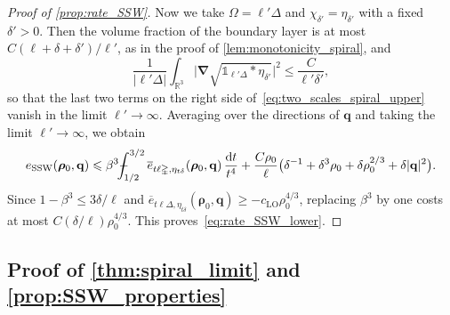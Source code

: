 \documentclass[final,reqno]{amsart}
\theoremstyle{remark}
\renewcommand{\le}{\leqslant}
\renewcommand{\ge}{\geqslant}
\newcommand{\ol}[1]{\overline{#1}}
\newcommand{\RR}{\mathbb{R}}
\newcommand{\LO}{\mathrm{LO}}
\newcommand{\SSW}{\mathrm{SSW}}
\newcommand{\iden}{\mathbb{1}}
\newcommand{\grad}{\bm{\nabla}}
\newcommand{\tetra}{\mathbb{\Delta}}
\newcommand{\dd}{\mathrm{d}}
\def\Xint#1{\mathchoice
{\XXint\displaystyle\textstyle{#1}}
{\XXint\textstyle\scriptstyle{#1}}
{\XXint\scriptstyle\scriptscriptstyle{#1}}
{\XXint\scriptscriptstyle\scriptscriptstyle{#1}}
\!\int}
\def\XXint#1#2#3{{\setbox0=\hbox{$#1{#2#3}{\int}$ }
\vcenter{\hbox{$#2#3$ }}\kern-.6\wd0}}
\def\dashint{\Xint-}
\begin{document}
\begin{proof}[Proof of \cref{prop:rate_SSW}]
Now we take $\Omega=\ell'\tetra$ and $\chi_{\delta'}=\eta_{\delta'}$ with a fixed $\delta'>0$. Then the volume fraction of the boundary layer is at most $C(\ell+\delta+\delta')/\ell'$, as in the proof of \cref{lem:monotonicity_spiral}, and
\[
 \frac{1}{|\ell'\tetra|}\int_{\RR^3}\big|\grad\sqrt{\iden_{\ell'\tetra}\ast\eta_{\delta'}}\big|^2\le\frac{C}{\ell'\delta'},
\]
so that the last two terms on the right side of~\cref{eq:two_scales_spiral_upper} vanish in the limit $\ell'\to\infty$. Averaging over the directions of $\mathbf{q}$ and taking the limit $\ell'\to\infty$, we obtain
\[
 e_\SSW(\bm{\rho}_0,\mathbf{q})\le\beta^3\dashint_{1/2}^{3/2}\ol e_{t\ell\tetra,\eta_{t\delta}}(\bm{\rho}_0,\mathbf{q})\,\frac{\dd t}{t^4}
 +\frac{C\rho_0}{\ell}\big(\delta^{-1}+\delta^3\rho_0+\delta\rho_0^{2/3}+\delta|\mathbf{q}|^2\big).
\]
Since $1-\beta^3\le3\delta/\ell$ and $\ol e_{t\ell\tetra,\eta_{t\delta}}(\bm{\rho}_0,\mathbf{q})\ge-c_\LO\rho_0^{4/3}$, replacing $\beta^3$ by one costs at most $C(\delta/\ell)\rho_0^{4/3}$. This proves~\cref{eq:rate_SSW_lower}.
\end{proof}

\subsection{Proof of \texorpdfstring{\cref{thm:spiral_limit} and \cref{prop:SSW_properties}}{the SSW gas limit and its properties}}\label{sec:proof_spiral_limit}
\end{document}
